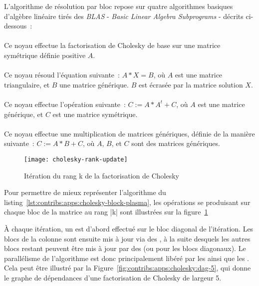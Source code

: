 L'algorithme de résolution par bloc repose sur quatre algorithmes basiques d'algèbre linéaire tirés des \emph{BLAS} - \emph{Basic Linear Algebra Subprograms} - décrits ci-dessous~:


\paragraph{}

Ce noyau effectue la factorisation de Cholesky de base sur une matrice symétrique définie positive $A$.

\paragraph{}

Ce noyau résoud l'équation suivante~: $A*X = B$, où $A$ est une matrice triangulaire, et $B$ une matrice générique. $B$ est écrasée par la matrice solution $X$.

\paragraph{}

Ce noyau effectue l'opération suivante~: $C := A*A^t + C$, où $A$ est une matrice générique, et $C$ est une matrice symétrique.

\paragraph{}

Ce noyau effectue une multiplication de matrices génériques, définie de la manière suivante~: $C := A*B + C$, où $A$, $B$, et $C$ sont des matrices génériques.

\begin{figure}[h]
  \centering
  \texttt{[image: cholesky-rank-update]}
  \caption{Itération du rang k de la factorisation de Cholesky}\label{fig:contribs:apps:cholesky:rank-update}
\end{figure}

Pour permettre de mieux représenter l'algorithme du listing~\ref{lst:contribs:apps:cholesky-block-plasma}, les opérations se produisant sur chaque bloc de la matrice au rang |k| sont illustrées sur la figure~\ref{fig:contribs:apps:cholesky:rank-update}


À chaque itération, un \potrf est d'abord effectué sur le bloc diagonal de l'itération. Les blocs de la colonne sont ensuite mis à jour via des \trsm, à la suite desquels les autres blocs restant peuvent être mis à jour par des \gemm (ou \syrk pour les blocs diagonaux).
Le parallélisme de l'algorithme est donc principalement libéré par les \potrf ainsi que les \trsm.
Cela peut être illustré par la Figure~\ref{fig:contribs:apps:cholesky:dag-5}, qui donne le graphe de dépendances d'une factorisation de Cholesky de largeur 5.

